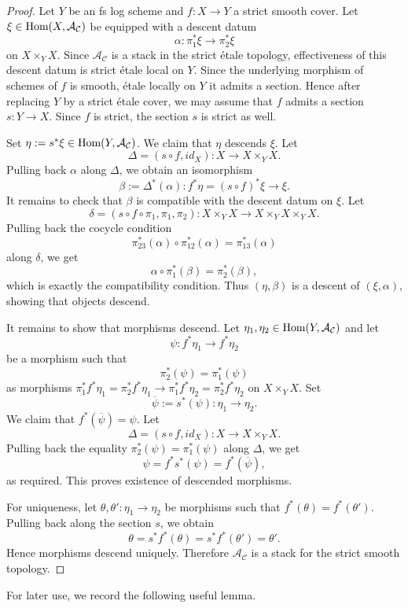 \documentclass[11pt]{amsart}
\theoremstyle{definition}
\theoremstyle{remark}
\DeclareMathOperator{\Hom}{\textup{Hom}}
\begin{document}
\begin{proof}
	Let $Y$ be an fs log scheme and $f:X\to Y$ a strict smooth cover. Let $\xi\in \Hom(X,\mathcal{A}_{\mathcal{C}})$ be equipped
	with a descent datum
	$$\alpha:\pi_1^*\xi\to \pi_2^*\xi$$
	on $X\times_Y X$. Since $\mathcal{A}_{\mathcal{C}}$ is a stack in the strict étale topology, effectiveness
	of this descent datum is strict étale local on $Y$. Since the underlying morphism of schemes of $f$
	is smooth, étale locally on $Y$ it admits a section. Hence after replacing $Y$ by a strict étale cover,
	we may assume that $f$ admits a section $s:Y\to X$. Since $f$ is strict, the section $s$ is strict as well.

	Set $\eta:=s^*\xi\in \Hom(Y,\mathcal{A}_{\mathcal{C}})$. We claim that $\eta$ descends $\xi$.
	Let
	$$\Delta=(s\circ f,id_X):X\to X\times_Y X.$$
	Pulling back $\alpha$ along $\Delta$, we obtain an isomorphism
	$$\beta:=\Delta^*(\alpha):f^*\eta=(s\circ f)^*\xi\to \xi.$$
	It remains to check that $\beta$ is compatible with the descent datum on $\xi$.
	Let
	$$\delta=(s\circ f\circ \pi_1,\pi_1,\pi_2):X\times_Y X\to X\times_Y X\times_Y X.$$
	Pulling back the cocycle condition
	$$\pi_{23}^*(\alpha)\circ \pi_{12}^*(\alpha)=\pi_{13}^*(\alpha)$$
	along $\delta$, we get
	$$\alpha\circ \pi_1^*(\beta)=\pi_2^*(\beta),$$
	which is exactly the compatibility condition. Thus $(\eta,\beta)$ is a descent of $(\xi,\alpha)$,
	showing that objects descend.

	It remains to show that morphisms descend. Let $\eta_1,\eta_2\in \Hom(Y,\mathcal{A}_{\mathcal{C}})$ and let
	$$\psi:f^*\eta_1\to f^*\eta_2$$
	be a morphism such that
	$$\pi_2^*(\psi)=\pi_1^*(\psi)$$
	as morphisms $\pi_1^*f^*\eta_1=\pi_2^*f^*\eta_1\to \pi_1^*f^*\eta_2=\pi_2^*f^*\eta_2$ on $X\times_Y X$.
	Set
	$$\overline{\psi}:=s^*(\psi):\eta_1\to \eta_2.$$
	We claim that $f^*(\overline{\psi})=\psi$. Let
	$$\Delta=(s\circ f,id_X):X\to X\times_Y X.$$
	Pulling back the equality $\pi_2^*(\psi)=\pi_1^*(\psi)$ along $\Delta$, we get
	$$\psi=f^*s^*(\psi)=f^*(\overline{\psi}),$$
	as required. This proves existence of descended morphisms.

	For uniqueness, let $\theta,\theta':\eta_1\to \eta_2$ be morphisms such that
	$f^*(\theta)=f^*(\theta')$. Pulling back along the section $s$, we obtain
	$$\theta=s^*f^*(\theta)=s^*f^*(\theta')=\theta'.$$
	Hence morphisms descend uniquely. Therefore $\mathcal{A}_{\mathcal{C}}$
	is a stack for the strict smooth topology.
\end{proof}

For later use, we record the following useful lemma.
\end{document}
